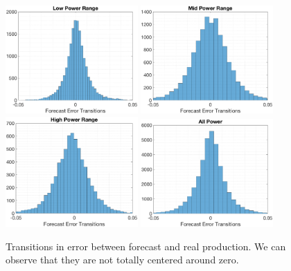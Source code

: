 \documentclass[11pt]{article}
\theoremstyle{definition}
\begin{document}
\begin{figure}[H]
\centering
\includegraphics[width=0.45\textwidth]{plots/LP_t.eps}
\includegraphics[width=0.45\textwidth]{plots/MP_t.eps}\\
\includegraphics[width=0.45\textwidth]{plots/HP_t.eps}
\includegraphics[width=0.45\textwidth]{plots/AP_t.eps}
\caption{Transitions in error between forecast and real production. We can observe that they are not totally centered around zero.}
\label{fig:error_transitions}
\end{figure}
\end{document}
